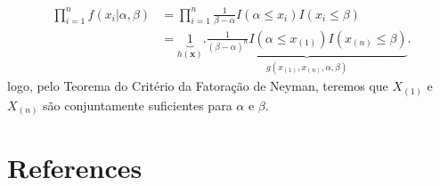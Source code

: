\documentclass[
  letterpaper,
  DIV=11,
  numbers=noendperiod]{scrreprt}
\newlength{\cslhangindent}
\newenvironment{CSLReferences}[2] %
 {\begin{list}{}{%
  \setlength{\itemindent}{0pt}
  \setlength{\leftmargin}{0pt}
  \setlength{\parsep}{0pt}
  \ifodd #1
   \setlength{\leftmargin}{\cslhangindent}
   \setlength{\itemindent}{-1\cslhangindent}
  \fi
  \setlength{\itemsep}{#2\baselineskip}}}
 {\end{list}}
\begin{document}
\[\begin{align}\prod_{i=1}^n f(x_i|\alpha,\beta)&=\prod_{i=1}^n \frac{1}{\beta-\alpha}I(\alpha\leq x_i)I(x_i\leq\beta)\\&=\underbrace{1}_{h(\textbf{x})}.\underbrace{\frac{1}{(\beta-\alpha)^n}I(\alpha\leq x_{(1)})I(x_{(n)}\leq\beta)}_{g(x_{(1)},x_{(n)},\alpha,\beta
)}.\end{align}\] logo, pelo Teorema do Critério da Fatoração de Neyman,
teremos que \(X_{(1)}\) e \(X_{(n)}\) são conjuntamente suficientes para
\(\alpha\) e \(\beta\).


\chapter*{References}\label{references}


\label{refs}
\begin{CSLReferences}{0}{1}
\end{CSLReferences}
\end{document}
